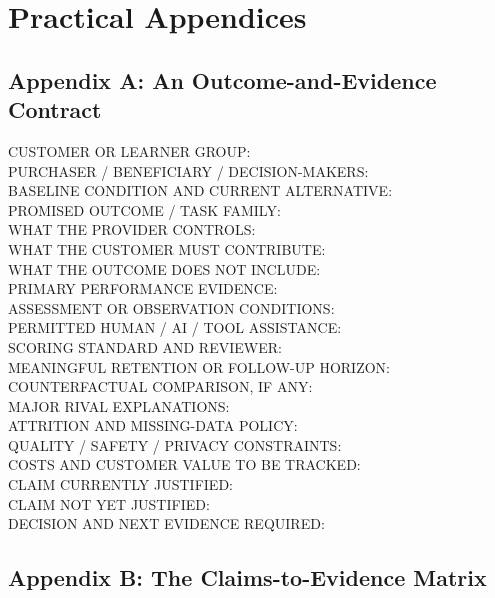 \section*{Practical Appendices}

\subsection*{Appendix A: An Outcome-and-Evidence Contract}

\begin{tcolorbox}[colback=white,colframe=BayesSecondary!40,arc=2pt,boxrule=0.6pt,title={\small\textbf{The Outcome-and-Evidence Contract Template}}]
\footnotesize\ttfamily
CUSTOMER OR LEARNER GROUP: \\
PURCHASER / BENEFICIARY / DECISION-MAKERS: \\
BASELINE CONDITION AND CURRENT ALTERNATIVE: \\
PROMISED OUTCOME / TASK FAMILY: \\
WHAT THE PROVIDER CONTROLS: \\
WHAT THE CUSTOMER MUST CONTRIBUTE: \\
WHAT THE OUTCOME DOES NOT INCLUDE: \\
PRIMARY PERFORMANCE EVIDENCE: \\
ASSESSMENT OR OBSERVATION CONDITIONS: \\
PERMITTED HUMAN / AI / TOOL ASSISTANCE: \\
SCORING STANDARD AND REVIEWER: \\
MEANINGFUL RETENTION OR FOLLOW-UP HORIZON: \\
COUNTERFACTUAL COMPARISON, IF ANY: \\
MAJOR RIVAL EXPLANATIONS: \\
ATTRITION AND MISSING-DATA POLICY: \\
QUALITY / SAFETY / PRIVACY CONSTRAINTS: \\
COSTS AND CUSTOMER VALUE TO BE TRACKED: \\
CLAIM CURRENTLY JUSTIFIED: \\
CLAIM NOT YET JUSTIFIED: \\
DECISION AND NEXT EVIDENCE REQUIRED:
\end{tcolorbox}

\subsection*{Appendix B: The Claims-to-Evidence Matrix}

